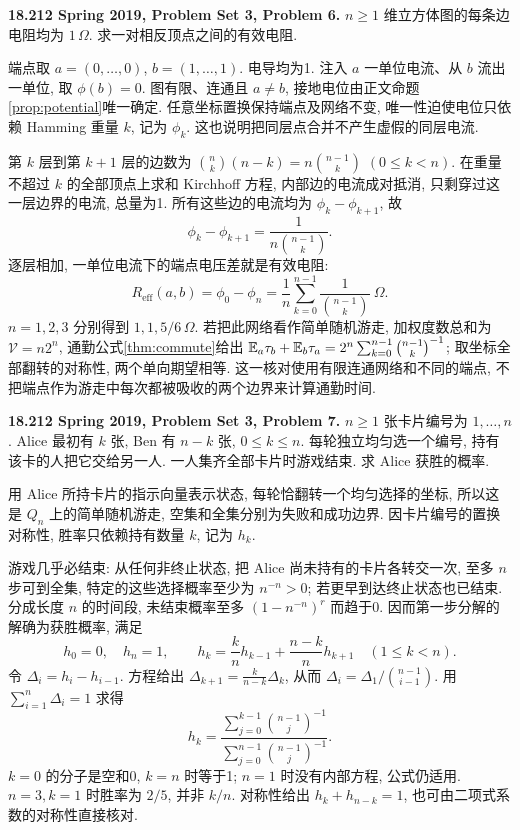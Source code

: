 \begin{exercise}\label{mit:18212-pset3-q6}
\textbf{18.212 Spring 2019, Problem Set 3, Problem 6.}
$n\ge1$ 维立方体图的每条边电阻均为 $1\,\Omega$. 求一对相反顶点之间的有效电阻.
\end{exercise}
\begin{solution}
端点取 $a=(0,\ldots,0)$, $b=(1,\ldots,1)$. 电导均为1. 注入 $a$ 一单位电流、从 $b$ 流出一单位, 取 $\phi(b)=0$. 图有限、连通且 $a\ne b$, 接地电位由正文命题\ref{prop:potential}唯一确定. 任意坐标置换保持端点及网络不变, 唯一性迫使电位只依赖 Hamming 重量 $k$, 记为 $\phi_k$. 这也说明把同层点合并不产生虚假的同层电流.

第 $k$ 层到第 $k+1$ 层的边数为
$\binom nk(n-k)=n\binom{n-1}k$ $(0\le k<n)$. 在重量不超过 $k$ 的全部顶点上求和 Kirchhoff 方程, 内部边的电流成对抵消, 只剩穿过这一层边界的电流, 总量为1. 所有这些边的电流均为 $\phi_k-\phi_{k+1}$, 故
\[
 \phi_k-\phi_{k+1}=\frac1{n\binom{n-1}k}.
\]
逐层相加, 一单位电流下的端点电压差就是有效电阻:
\[
 R_{\mathrm{eff}}(a,b)=\phi_0-\phi_n
       =\frac1n\sum_{k=0}^{n-1}\frac1{\binom{n-1}k}\ \Omega.
\]
$n=1,2,3$ 分别得到 $1,1,5/6\,\Omega$. 若把此网络看作简单随机游走, 加权度数总和为 $\mathcal V=n2^n$, 通勤公式\ref{thm:commute}给出
$\mathbb E_a\tau_b+\mathbb E_b\tau_a=2^n\sum_{k=0}^{n-1}\binom{n-1}k^{-1}$; 取坐标全部翻转的对称性, 两个单向期望相等. 这一核对使用有限连通网络和不同的端点, 不把端点作为游走中每次都被吸收的两个边界来计算通勤时间.
\end{solution}

\begin{exercise}\label{mit:18212-pset3-q7}
\textbf{18.212 Spring 2019, Problem Set 3, Problem 7.}
$n\ge1$ 张卡片编号为 $1,\ldots,n$. Alice 最初有 $k$ 张, Ben 有 $n-k$ 张, $0\le k\le n$. 每轮独立均匀选一个编号, 持有该卡的人把它交给另一人. 一人集齐全部卡片时游戏结束. 求 Alice 获胜的概率.
\end{exercise}
\begin{solution}
用 Alice 所持卡片的指示向量表示状态, 每轮恰翻转一个均匀选择的坐标, 所以这是 $Q_n$ 上的简单随机游走, 空集和全集分别为失败和成功边界. 因卡片编号的置换对称性, 胜率只依赖持有数量 $k$, 记为 $h_k$.

游戏几乎必结束: 从任何非终止状态, 把 Alice 尚未持有的卡片各转交一次, 至多 $n$ 步可到全集, 特定的这些选择概率至少为 $n^{-n}>0$; 若更早到达终止状态也已结束. 分成长度 $n$ 的时间段, 未结束概率至多 $(1-n^{-n})^r$ 而趋于0. 因而第一步分解的解确为获胜概率, 满足
\[
 h_0=0,\quad h_n=1,\qquad
 h_k=\frac{k}{n}h_{k-1}+\frac{n-k}{n}h_{k+1}\quad(1\le k<n).
\]
令 $\Delta_i=h_i-h_{i-1}$. 方程给出
$\Delta_{k+1}=\frac{k}{n-k}\Delta_k$, 从而
$\Delta_i=\Delta_1/\binom{n-1}{i-1}$. 用 $\sum_{i=1}^n\Delta_i=1$ 求得
\[
 h_k=\frac{\displaystyle\sum_{j=0}^{k-1}\binom{n-1}j^{-1}}
            {\displaystyle\sum_{j=0}^{n-1}\binom{n-1}j^{-1}}.
\]
$k=0$ 的分子是空和0, $k=n$ 时等于1; $n=1$ 时没有内部方程, 公式仍适用. $n=3,k=1$ 时胜率为 $2/5$, 并非 $k/n$. 对称性给出 $h_k+h_{n-k}=1$, 也可由二项式系数的对称性直接核对.
\end{solution}

